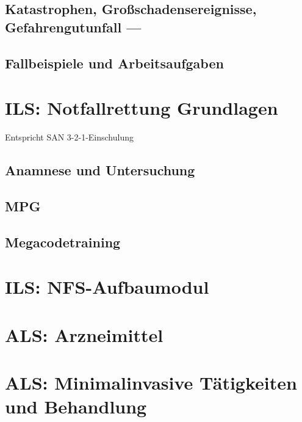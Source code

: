 
\chapter{Katastrophen, Gro{\ss}schadensereignisse,
Gefahrengutunfall --- }

\chapter{Fallbeispiele und Arbeitsaufgaben}

\addtocounter{chapter}{0}
\part{ILS: Notfallrettung Grundlagen}
{\mdseries
Entspricht SAN 3-2-1-Einschulung}

\chapter{Anamnese und Untersuchung}

\chapter{MPG}

\chapter{Megacodetraining}

\addtocounter{chapter}{0}
\part{ILS: NFS-Aufbaumodul}
\addtocounter{chapter}{0}
\part{ALS: Arzneimittel}
\addtocounter{chapter}{0}
\part{ALS: Minimalinvasive Tätigkeiten und Behandlung}